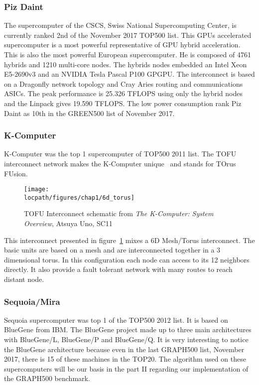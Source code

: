\subsubsection{Piz Daint}
The supercomputer of the CSCS, Swiss National Supercomputing Center, is currently ranked 2nd of the November 2017 TOP500 list. 
This GPUs accelerated supercomputer is a most powerful representative of GPU hybrid acceleration.
This is also the most powerful European supercomputer. 
He is composed of 4761 hybrids and 1210 multi-core nodes. 
The hybrids nodes embedded an Intel Xeon E5-2690v3 and an NVIDIA Tesla Pascal P100 GPGPU. 
The interconnect is based on a Dragonfly network topology and Cray Aries routing and communications ASICs. 
The peak performance is 25.326 TFLOPS using only the hybrid nodes and the Linpack gives 19.590 TFLOPS.
The low power consumption rank Piz Daint as 10th in the GREEN500 list of November 2017. 

\subsubsection{K-Computer}
K-Computer was the top 1 supercomputer of TOP500 2011 list. 
The TOFU interconnect network makes the K-Computer unique~\cite{ajima2009tofu} and stands for TOrus FUsion.
\begin{figure}[t!]
\begin{center}
\texttt{[image: \\locpath/figures/chap1/6d\_torus]}
\end{center}
\caption{TOFU Interconnect schematic from \textit{The K-Computer: System Overview}, Atsuya Uno, SC11}
\label{fig:1_HPC:tofu}
\end{figure}
This interconnect presented in figure~\ref{fig:1_HPC:tofu} mixes a 6D Mesh/Torus interconnect.
The basic units are based on a mesh and are interconnected together in a 3 dimensional torus. 
In this configuration each node can access to its 12 neighbors directly. 
It also provide a fault tolerant network with many routes to reach distant node. 

\subsubsection{Sequoia/Mira}
Sequoia supercomputer was top 1 of the TOP500 2012 list. 
It is based on BlueGene from IBM.
The BlueGene project made up to three main architectures with BlueGene/L, BlueGene/P and BlueGene/Q.
It is very interesting to notice the BlueGene architecture because even in the last GRAPH500 list, November 2017, there is 15 of these machines in the TOP20.
The algorithm used on these supercomputers will be our basis in the part II regarding our implementation of the GRAPH500 benchmark.


